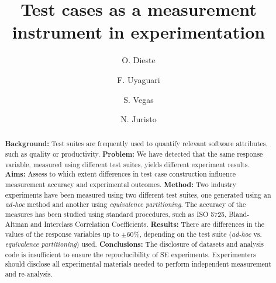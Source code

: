 \documentclass[acmsmall]{acmart}
\begin{document}
\title{Test cases as a measurement instrument in experimentation}

\author{O. Dieste}

\author{F. Uyaguari}

\author{S. Vegas}

\author{N. Juristo}

\renewcommand{\shortauthors}{O. Dieste, et al.}

\begin{abstract}
\textbf{Background:} Test suites are frequently used to quantify relevant software attributes, such as quality or productivity. \textbf{Problem:} We have detected that the same response variable, measured using different test suites, yields different experiment results. \textbf{Aims:} Assess to which extent differences in test case construction influence measurement accuracy and experimental outcomes. \textbf{Method:} Two industry experiments have been measured using two different test suites, one generated using an \textit{ad-hoc} method and another using \textit{equivalence partitioning}. The accuracy of the measures has been studied using standard procedures, such as ISO 5725, Bland-Altman and Interclass Correlation Coefficients. \textbf{Results:} There are differences in the values of the response variables up to $\pm 60\%$, depending on the test suite (\textit{ad-hoc} vs. \textit{equivalence partitioning}) used. \textbf{Conclusions:} The disclosure of datasets and analysis code is insufficient to ensure the reproducibility of SE experiments. Experimenters should disclose all experimental materials needed to perform independent measurement and re-analysis.
\end{abstract}
\end{document}
